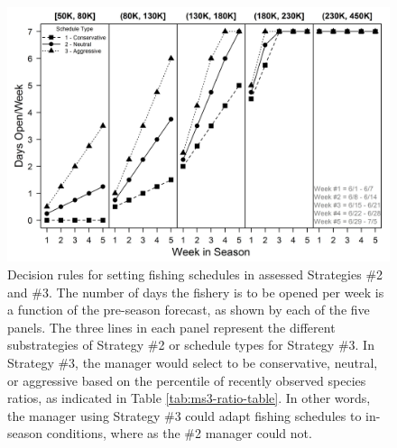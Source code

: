 \documentclass[12pt,]{book}
\theoremstyle{definition}
\theoremstyle{definition}
\theoremstyle{definition}
\theoremstyle{remark}
\begin{document}
\begin{singlespace}
\begin{figure}
  \centering
  \includegraphics{img/Ch3/Schedules.png}
  \caption{Decision rules for setting fishing schedules in assessed Strategies \#2 and \#3. The number of days the fishery is to be opened per week is a function of the pre-season forecast, as shown by each of the five panels. The three lines in each panel represent the different substrategies of Strategy \#2 or schedule types for Strategy \#3. In Strategy \#3, the manager would select to be conservative, neutral, or aggressive based on the percentile of recently observed species ratios, as indicated in Table \ref{tab:ms3-ratio-table}. In other words, the manager using Strategy \#3 could adapt fishing schedules to in-season conditions, where as the \#2 manager could not.}
  \label{fig:ms2-schedules}
\end{figure}

\clearpage


\end{singlespace}
\end{document}
